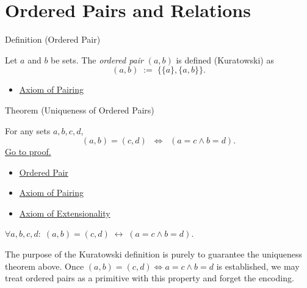 
\section{Ordered Pairs and Relations}


\begin{definitionbox}{Definition (Ordered Pair)}
\begin{definition}\label{def:ordered-pair}
Let $a$ and $b$ be sets. The \emph{ordered pair} $(a,b)$ is defined (Kuratowski)
as
\[
(a,b) \;:=\; \{\{a\}, \{a,b\}\}.
\]
\end{definition}
\end{definitionbox}

\begin{dependencies}
\begin{itemize}
  \item \hyperref[ax:pairing]{Axiom of Pairing}
\end{itemize}
\end{dependencies}

\begin{theorembox}{Theorem (Uniqueness of Ordered Pairs)}
\begin{theorem}\label{thm:ordered-pair-unique}
For any sets $a,b,c,d$,
\[
(a,b) = (c,d)
\;\;\Longleftrightarrow\;\;
(a = c \land b = d).
\]
\hyperref[prf:ordered-pair-unique]{Go to proof.}
\end{theorem}
\end{theorembox}

\begin{dependencies}
\begin{itemize}
  \item \hyperref[def:ordered-pair]{Ordered Pair}
  \item \hyperref[ax:pairing]{Axiom of Pairing}
  \item \hyperref[ax:extensionality]{Axiom of Extensionality}
\end{itemize}
\end{dependencies}

\begin{remark*}
$\forall a, b, c, d:\; (a,b) = (c,d) \;\leftrightarrow\; (a = c \wedge b = d)$.
\end{remark*}
\begin{remark*}
The purpose of the Kuratowski definition is purely to guarantee the uniqueness
theorem above. Once $(a,b) = (c,d) \iff a=c \land b=d$ is established,
we may treat ordered pairs as a primitive with this property and forget the
encoding.
\end{remark*}

